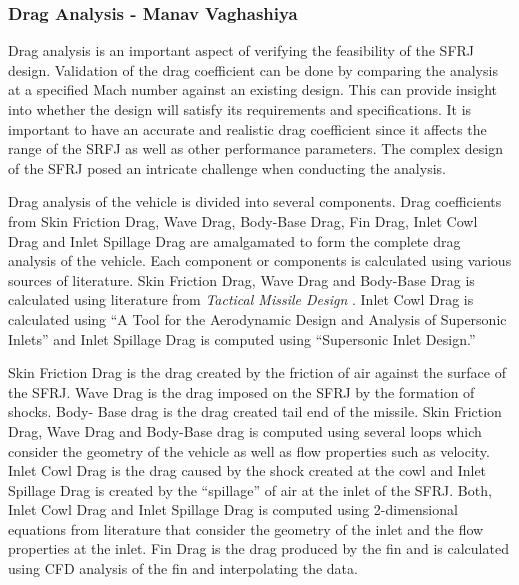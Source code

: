 \subsubsection{Drag Analysis - Manav Vaghashiya}
Drag analysis is an important aspect of verifying the feasibility of the SFRJ design. Validation of the drag coefficient can be done by comparing the analysis at a specified Mach number against an existing design. This can provide insight into whether the design will satisfy its requirements and specifications. It is important to have an accurate and realistic drag coefficient since it affects the range of the SRFJ as well as other performance parameters. The complex design of the SFRJ posed an intricate challenge when conducting the analysis.

Drag analysis of the vehicle is divided into several components. Drag coefficients from Skin Friction Drag, Wave Drag, Body-Base Drag, Fin Drag, Inlet Cowl Drag and Inlet Spillage Drag are amalgamated to form the complete drag analysis of the vehicle. Each component or components is calculated using various sources of literature. Skin Friction Drag, Wave Drag and Body-Base Drag is calculated using literature from \textit{Tactical Missile Design} \cite{fleeman_2001}. Inlet Cowl Drag is calculated using “A Tool for the Aerodynamic Design and Analysis of Supersonic Inlets” and Inlet Spillage Drag is computed using “Supersonic Inlet Design.”

Skin Friction Drag is the drag created by the friction of air against the surface of the SFRJ. Wave Drag is the drag imposed on the SFRJ by the formation of shocks. Body- Base drag is the drag created tail end of the missile. Skin Friction Drag, Wave Drag and Body-Base drag is computed using several loops which consider the geometry of the vehicle as well as flow properties such as velocity. Inlet Cowl Drag is the drag caused by the shock created at the cowl and Inlet Spillage Drag is created by the “spillage” of air at the inlet of the SFRJ. Both, Inlet Cowl Drag and Inlet Spillage Drag is computed using 2-dimensional equations from literature that consider the geometry of the inlet and the flow properties at the inlet. Fin Drag is the drag produced by the fin and is calculated using CFD analysis of the fin and interpolating the data. 
